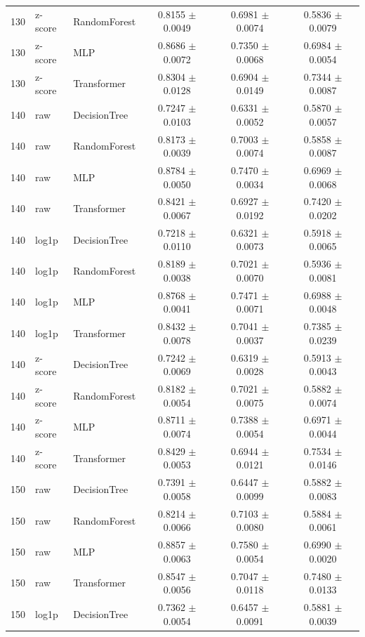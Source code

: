 \begin{longtable}{rllccc}
130 & z-score & RandomForest & 0.8155 $\pm$ 0.0049 & 0.6981 $\pm$ 0.0074 & 0.5836 $\pm$ 0.0079 \\
130 & z-score & MLP & 0.8686 $\pm$ 0.0072 & 0.7350 $\pm$ 0.0068 & 0.6984 $\pm$ 0.0054 \\
130 & z-score & Transformer & 0.8304 $\pm$ 0.0128 & 0.6904 $\pm$ 0.0149 & 0.7344 $\pm$ 0.0087 \\
140 & raw & DecisionTree & 0.7247 $\pm$ 0.0103 & 0.6331 $\pm$ 0.0052 & 0.5870 $\pm$ 0.0057 \\
140 & raw & RandomForest & 0.8173 $\pm$ 0.0039 & 0.7003 $\pm$ 0.0074 & 0.5858 $\pm$ 0.0087 \\
140 & raw & MLP & 0.8784 $\pm$ 0.0050 & 0.7470 $\pm$ 0.0034 & 0.6969 $\pm$ 0.0068 \\
140 & raw & Transformer & 0.8421 $\pm$ 0.0067 & 0.6927 $\pm$ 0.0192 & 0.7420 $\pm$ 0.0202 \\
140 & log1p & DecisionTree & 0.7218 $\pm$ 0.0110 & 0.6321 $\pm$ 0.0073 & 0.5918 $\pm$ 0.0065 \\
140 & log1p & RandomForest & 0.8189 $\pm$ 0.0038 & 0.7021 $\pm$ 0.0070 & 0.5936 $\pm$ 0.0081 \\
140 & log1p & MLP & 0.8768 $\pm$ 0.0041 & 0.7471 $\pm$ 0.0071 & 0.6988 $\pm$ 0.0048 \\
140 & log1p & Transformer & 0.8432 $\pm$ 0.0078 & 0.7041 $\pm$ 0.0037 & 0.7385 $\pm$ 0.0239 \\
140 & z-score & DecisionTree & 0.7242 $\pm$ 0.0069 & 0.6319 $\pm$ 0.0028 & 0.5913 $\pm$ 0.0043 \\
140 & z-score & RandomForest & 0.8182 $\pm$ 0.0054 & 0.7021 $\pm$ 0.0075 & 0.5882 $\pm$ 0.0074 \\
140 & z-score & MLP & 0.8711 $\pm$ 0.0074 & 0.7388 $\pm$ 0.0054 & 0.6971 $\pm$ 0.0044 \\
140 & z-score & Transformer & 0.8429 $\pm$ 0.0053 & 0.6944 $\pm$ 0.0121 & 0.7534 $\pm$ 0.0146 \\
150 & raw & DecisionTree & 0.7391 $\pm$ 0.0058 & 0.6447 $\pm$ 0.0099 & 0.5882 $\pm$ 0.0083 \\
150 & raw & RandomForest & 0.8214 $\pm$ 0.0066 & 0.7103 $\pm$ 0.0080 & 0.5884 $\pm$ 0.0061 \\
150 & raw & MLP & 0.8857 $\pm$ 0.0063 & 0.7580 $\pm$ 0.0054 & 0.6990 $\pm$ 0.0020 \\
150 & raw & Transformer & 0.8547 $\pm$ 0.0056 & 0.7047 $\pm$ 0.0118 & 0.7480 $\pm$ 0.0133 \\
150 & log1p & DecisionTree & 0.7362 $\pm$ 0.0054 & 0.6457 $\pm$ 0.0091 & 0.5881 $\pm$ 0.0039 \\

\end{longtable}

